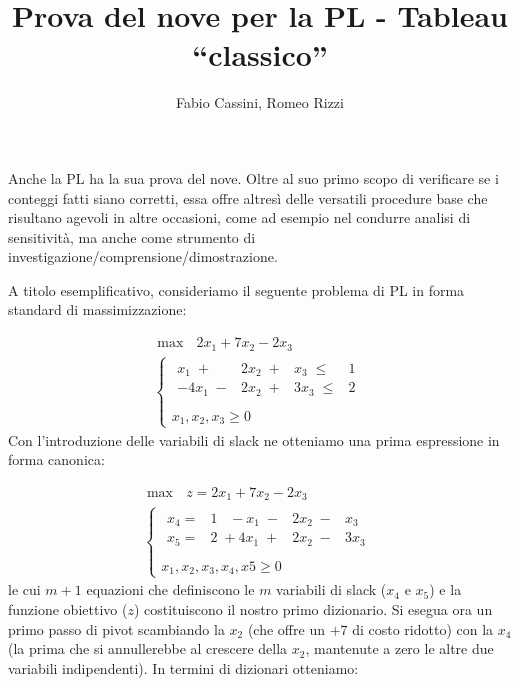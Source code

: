 \documentclass{article}
\title{Prova del nove per la PL - Tableau ``classico''}
\author{Fabio Cassini, Romeo Rizzi}
\begin{document}
\maketitle

  	Anche la PL ha la sua prova del nove. Oltre al suo primo scopo di verificare se i conteggi fatti siano corretti, essa offre altresì delle versatili procedure base che risultano agevoli in altre occasioni, come ad esempio nel condurre analisi di sensitività, ma anche come strumento di investigazione/comprensione/dimostrazione. 
  	
  	A titolo esemplificativo, consideriamo il seguente problema di PL in forma standard di massimizzazione:
  	
  	\[
	  	\begin{array}{l}
		  	\max \mbox{\ }2x_1 + 7x_2 -2x_3\\
		  	\left\{
		  	\begin{array}{l}
		  	\begin{array}{rrrr}
		  	x_1 \;+&  2x_2 \;+&  x_3 \;\leq &   1 \\
		  	-4x_1 \;-& 2x_2 \;+& 3x_3 \;\leq &   2 \\
		  	\end{array} \\
		  	x_1, x_2, x_3  \geq 0    
		  	\end{array}
		  	\right.
	  	\end{array}
  	\]
  	Con l'introduzione delle variabili di slack ne otteniamo una prima espressione in forma canonica:

  	\[
	  	\begin{array}{l}
		  	\max \mbox{\ }z = 2x_1 + 7x_2 -2x_3\\
		  	\left\{
		  	\begin{array}{l}
		  	\begin{array}{rrrr}
		  	x_4 =& 1 \;\;\;-x_1 \;-&  2x_2 \;-&  x_3 \\
		  	x_5 =& 2 \;+4x_1 \;+& 2x_2 \;-& 3x_3 \\
		  	\end{array} \\
		  	x_1, x_2, x_3, x_4, x5  \geq 0    
		  	\end{array}
		  	\right.
	  	\end{array}
      \]
      le cui $m+1$ equazioni che definiscono le $m$ variabili di slack ($x_4$ e $x_5$) e la funzione obiettivo ($z$) costituiscono il nostro primo dizionario. Si esegua ora un primo passo di pivot scambiando la $x_2$ (che offre un $+7$ di costo ridotto) con la $x_4$ (la prima che si annullerebbe al crescere della $x_2$, mantenute a zero le altre due variabili indipendenti). In termini di dizionari otteniamo:
  	
\end{document}
